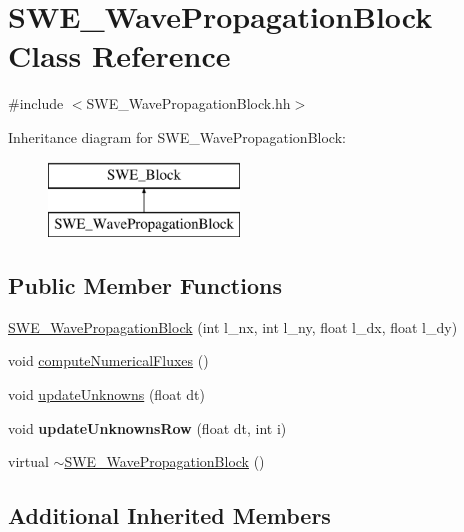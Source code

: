 \hypertarget{classSWE__WavePropagationBlock}{\section{S\-W\-E\-\_\-\-Wave\-Propagation\-Block Class Reference}
\label{classSWE__WavePropagationBlock}
}


{\ttfamily \#include $<$S\-W\-E\-\_\-\-Wave\-Propagation\-Block.\-hh$>$}

Inheritance diagram for S\-W\-E\-\_\-\-Wave\-Propagation\-Block\-:\begin{figure}[H]
\begin{center}
\leavevmode
\includegraphics[height=2.000000cm]{classSWE__WavePropagationBlock}
\end{center}
\end{figure}
\subsection*{Public Member Functions}
\begin{DoxyCompactItemize}
\item 
\hyperlink{classSWE__WavePropagationBlock_a9727e083d56a6d7aa9910f50c43080a9}{S\-W\-E\-\_\-\-Wave\-Propagation\-Block} (int l\-\_\-nx, int l\-\_\-ny, float l\-\_\-dx, float l\-\_\-dy)
\item 
void \hyperlink{classSWE__WavePropagationBlock_a5f6335a38fb3cf38623326959f06baf4}{compute\-Numerical\-Fluxes} ()
\item 
void \hyperlink{classSWE__WavePropagationBlock_a1b1422472a36602b34180e4ed27f6d8c}{update\-Unknowns} (float dt)
\item 
\hypertarget{classSWE__WavePropagationBlock_ad7c91177190b9d131387998d16fa7df6}{void {\bfseries update\-Unknowns\-Row} (float dt, int i)}\label{classSWE__WavePropagationBlock_ad7c91177190b9d131387998d16fa7df6}

\item 
virtual \hyperlink{classSWE__WavePropagationBlock_a9e53f3eaa7aee547ef88233069ff0667}{$\sim$\-S\-W\-E\-\_\-\-Wave\-Propagation\-Block} ()
\end{DoxyCompactItemize}
\subsection*{Additional Inherited Members}


